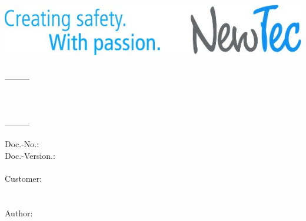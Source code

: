 \documentclass[twoside]{book}
\newcommand{\+}{\discretionary{\mbox{\scriptsize$\hookleftarrow$}}{}{}}
\newcommand{\clearemptydoublepage}{%
  \newpage{\pagestyle{empty}\cleardoublepage}%
}
\begin{document}
\hypersetup{pageanchor=false,
             bookmarks=true,
             bookmarksnumbered=true,
             pdfencoding=unicode
            }
\begin{titlepage}
{\hfill \includegraphics[scale=0.2]{110012_00992_00882_IMG-NewTecSloganLogo.jpg}}\\
\vspace*{4cm}\\
{\Large \textcolor{ntblue}{\_\_\_\_}}\\
\\
{\huge \textcolor{ntblue}{\textit{\NTDocumenttitle}}}\\
{\Large \textcolor{ntblue}{\textit{\NTProjectname}}}\\
{\Large \textcolor{ntblue}{\_\_\_\_}}\\
\vspace*{1.5cm}\\
{\small Doc.-No.:\quad\NTDocumentnumber}\\
{\small Doc.-Version.:\quad\NTVersion}\\
\vspace*{5cm}\\
Customer:\\
\NTCompanyCustomer\\
\vspace*{1.5cm}\\
Author:\\
\NTCompanyNT
\end{titlepage}
\clearemptydoublepage
\tableofcontents
\clearemptydoublepage
\hypersetup{pageanchor=true}

\end{document}

